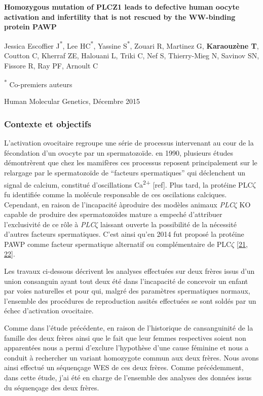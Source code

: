 \documentclass[12pt,twoside]{reedthesis}
\theoremstyle{definition}
\theoremstyle{definition}
\theoremstyle{remark}
\begin{document}
  \textbf{Homozygous mutation of PLCZ1 leads to defective human oocyte
  activation and infertility that is not rescued by the WW-binding protein
  PAWP}
  
  Jessica Escoffier J\textsuperscript{*}, Lee HC\textsuperscript{*},
  Yassine S\textsuperscript{*}, Zouari R, Martinez G, \textbf{Karaouzène
  T}, Coutton C, Kherraf ZE, Halouani L, Triki C, Nef S, Thierry-Mieg N,
  Savinov SN, Fissore R, Ray PF, Arnoult C
  
  \textsuperscript{*} Co-premiers auteurs
  
  Human Molecular Genetics, Décembre 2015
  
  \newpage
  
  \subsubsection{Contexte et objectifs}\label{contexte-et-objectifs-1}
  
  L'activation ovocitaire regroupe une série de processus intervenant au
  cour de la fécondation d'un ovocyte par un spermatozoïde. en 1990,
  plusieurs études démontrèrent que chez les mamifères ces processus
  reposent principalement sur le relargage par le spermatozoïde de
  ``facteurs spermatiques'' qui déclenchent un signal de calcium,
  constitué d'oscillations Ca\textsuperscript{2+} {[}ref{]}. Plus tard, la
  protéine PLC\(\zeta\) fu identifiée comme la molécule responsable de ces
  oscilations calciques. Cependant, en raison de l'incapacité àproduire
  des modèles animaux \emph{PLC}\(\zeta\) KO capable de produire des
  spermatozoïdes mature a empeché d'attribuer l'exclusivité de ce rôle à
  \emph{PLC}\(\zeta\) laissant ouverte la possibilité de la nécessité
  d'autres facteurs spermatiques. C'est ainsi qu'en 2014 fut proposé la
  protéine PAWP comme facteur spermatique alternatif ou complémentaire de
  PLC\(\zeta\) {[}\protect\hyperlink{ref-Aarabi2014}{21},
  \protect\hyperlink{ref-Aarabi2014a}{22}{]}.
  
  Les travaux ci-dessous décrivent les analyses effectuées sur deux frères
  issus d'un union consanguin ayant tout deux été dans l'incapacité de
  concevoir un enfant par voies naturelles et pour qui, malgré des
  paramètres spermatiques normaux, l'ensemble des procédures de
  reproduction assités effectuées se sont soldés par un échec d'activation
  ovocitaire.
  
  Comme dans l'étude précédente, en raison de l'historique de
  cansanguinité de la famille des deux frères ainsi que le fait que leur
  femmes respectives soient non apparentées nous a permi d'exclure
  l'hypothèse d'une cause féminine et nous a conduit à rechercher un
  variant homozygote commun aux deux frères. Nous avons ainsi effectué un
  séquençage WES de ces deux frères. Comme précédemment, dans cette étude,
  j'ai été en charge de l'ensemble des analyses des données issus du
  séquençage des deux frères.
  
\end{document}
